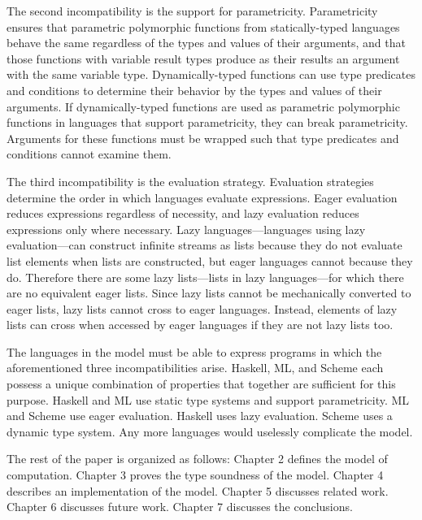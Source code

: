 The second incompatibility is the support for parametricity.  Parametricity ensures that parametric polymorphic functions from statically-typed languages behave the same regardless of the types and values of their arguments, and that those functions with variable result types produce as their results an argument with the same variable type.  Dynamically-typed functions can use type predicates and conditions to determine their behavior by the types and values of their arguments.  If dynamically-typed functions are used as parametric polymorphic functions in languages that support parametricity, they can break parametricity.  Arguments for these functions must be wrapped such that type predicates and conditions cannot examine them.

The third incompatibility is the evaluation strategy.  Evaluation strategies determine the order in which languages evaluate expressions.  Eager evaluation reduces expressions regardless of necessity, and lazy evaluation reduces expressions only where necessary.  Lazy languages---languages using lazy evaluation---can construct infinite streams as lists because they do not evaluate list elements when lists are constructed, but eager languages cannot because they do.  Therefore there are some lazy lists---lists in lazy languages---for which there are no equivalent eager lists.  Since lazy lists cannot be mechanically converted to eager lists, lazy lists cannot cross to eager languages.  Instead, elements of lazy lists can cross when accessed by eager languages if they are not lazy lists too.

The languages in the model must be able to express programs in which the aforementioned three incompatibilities arise.  Haskell, ML, and Scheme each possess a unique combination of properties that together are sufficient for this purpose.  Haskell and ML use static type systems and support parametricity.  ML and Scheme use eager evaluation.  Haskell uses lazy evaluation.  Scheme uses a dynamic type system.  Any more languages would uselessly complicate the model.

The rest of the paper is organized as follows: Chapter 2 defines the model of computation.  Chapter 3 proves the type soundness of the model.  Chapter 4 describes an implementation of the model.  Chapter 5 discusses related work.  Chapter 6 discusses future work.  Chapter 7 discusses the conclusions.